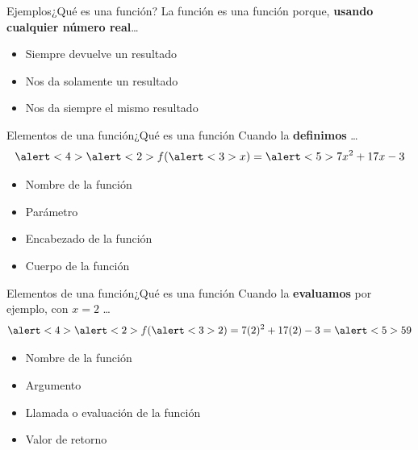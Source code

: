 \documentclass[spanish]{beamer}
\begin{document}
\begin{frame}{Ejemplos}{¿Qué es una función?}
    La función  es una función porque, \textbf{usando cualquier número real}\dots \pause

    \bigskip

    \begin{itemize}[<+->]
        \item Siempre devuelve un resultado
        \item Nos da solamente un resultado
        \item Nos da siempre el mismo resultado
    \end{itemize}
\end{frame}

\begin{frame}{Elementos de una función}{¿Qué es una función}
    Cuando la \textbf{definimos} \dots
$$\alert<4>{\alert<2>{f}(\alert<3>{x})} = \alert<5>{7x^2 + 17x - 3}$$ \pause

\begin{itemize}
    \item \alert<2>{Nombre de la función}
    \item \alert<3>{Parámetro}
    \item \alert<4>{Encabezado de la función}
    \item \alert<5>{Cuerpo de la función}    
\end{itemize}
\end{frame}

\begin{frame}{Elementos de una función}{¿Qué es una función}
    Cuando la \textbf{evaluamos} por ejemplo, con $x = 2$ \dots
$$\alert<4>{\alert<2>{f}(\alert<3>{2})} = 7(2)^2 + 17(2) - 3 = \alert<5>{59}$$ \pause

\begin{itemize}
    \item \alert<2>{Nombre de la función}
    \item \alert<3>{Argumento}
    \item \alert<4>{Llamada o evaluación de la función}
    \item \alert<5>{Valor de retorno}
\end{itemize}
\end{frame}




\end{document}
